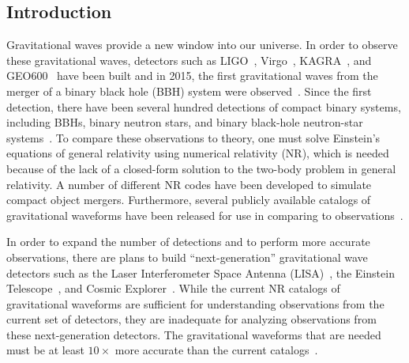 \begin{bibunit}[unsrtnat]
\newpage

\section{Introduction\label{sec:dgscl introduction}}

Gravitational waves provide a new window into our universe. In order to observe
these gravitational waves, detectors such as LIGO~\cite{LIGOScientific:2014pky},
Virgo~\cite{VIRGO:2014yos}, KAGRA~\cite{2021PTEP.2021eA101A}, and
GEO600~\cite{Dooley:2015fpa} have been built and in 2015, the first
gravitational waves from the merger of a binary black hole (BBH) system were
observed~\cite{PhysRevLett.116.061102}. Since the first detection, there have
been several hundred detections of compact binary systems, including BBHs,
binary neutron stars, and binary black-hole neutron-star
systems~\cite{Capote:2024rmo}. To compare these observations to theory, one must
solve Einstein's equations of general relativity using numerical relativity
(NR), which is needed because of the lack of a closed-form solution to the
two-body problem in general relativity. A number of different NR codes have been
developed to simulate compact object mergers. Furthermore, several publicly
available catalogs of gravitational waveforms have been released for use in
comparing to observations~\cite{Mroue:2013xna, Jani:2016wkt, Healy:2017psd,
Healy:2019jyf, Boyle:2019kee, 2025sxscatalog, Healy:2020vre, Healy:2022wdn,
Ferguson:2023vta}.

In order to expand the number of detections and to perform more accurate
observations, there are plans to build ``next-generation'' gravitational
wave detectors such as the Laser Interferometer Space Antenna
(LISA)~\cite{2017arXiv170200786A}, the Einstein
Telescope~\cite{2010CQGra..27s4002P}, and Cosmic Explorer~\cite{Evans:2021gyd}.
While the current NR catalogs of gravitational waveforms are sufficient for
understanding observations from the current set of detectors, they are
inadequate for analyzing observations from these next-generation detectors.
The gravitational waveforms that are needed must be at least $10\times$ more
accurate than the current catalogs~\cite{Purrer:2019jcp, Ferguson:2020xnm,
Jan:2023raq}.


\end{bibunit}
